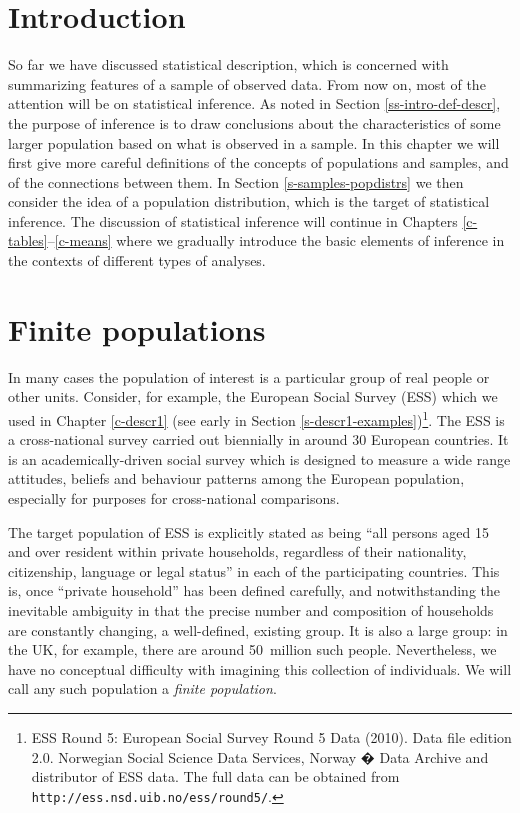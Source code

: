 \documentclass[11pt,a4paper,openany]{book}
\let\rmarkdownfootnote\footnote%
\def\footnote{\protect\rmarkdownfootnote}
\begin{document}
\section{Introduction}\label{s-samples-intro}

So far we have discussed statistical description, which is concerned
with summarizing features of a sample of observed data. From now on,
most of the attention will be on statistical inference. As noted in
Section \ref{ss-intro-def-descr}, the purpose of inference is to draw
conclusions about the characteristics of some larger population based on
what is observed in a sample. In this chapter we will first give more
careful definitions of the concepts of populations and samples, and of
the connections between them. In Section \ref{s-samples-popdistrs} we
then consider the idea of a population distribution, which is the target
of statistical inference. The discussion of statistical inference will
continue in Chapters \ref{c-tables}--\ref{c-means} where we gradually
introduce the basic elements of inference in the contexts of different
types of analyses.

\section{Finite populations}\label{s-samples-finpops}

In many cases the population of interest is a particular group of real
people or other units. Consider, for example, the European Social Survey
(ESS) which we used in Chapter \ref{c-descr1} (see early in Section
\ref{s-descr1-examples})\footnote{ESS Round 5: European Social Survey
  Round 5 Data (2010). Data file edition 2.0. Norwegian Social Science
  Data Services, Norway � Data Archive and distributor of ESS data. The
  full data can be obtained from
  \texttt{http://ess.nsd.uib.no/ess/round5/}.}. The ESS is a
cross-national survey carried out biennially in around 30 European
countries. It is an academically-driven social survey which is designed
to measure a wide range attitudes, beliefs and behaviour patterns among
the European population, especially for purposes for cross-national
comparisons.

The target population of ESS is explicitly stated as being ``all persons
aged 15 and over resident within private households, regardless of their
nationality, citizenship, language or legal status'' in each of the
participating countries. This is, once ``private household'' has been
defined carefully, and notwithstanding the inevitable ambiguity in that
the precise number and composition of households are constantly
changing, a well-defined, existing group. It is also a large group: in
the UK, for example, there are around 50~million such people.
Nevertheless, we have no conceptual difficulty with imagining this
collection of individuals. We will call any such population a
\emph{finite population}.
\end{document}
